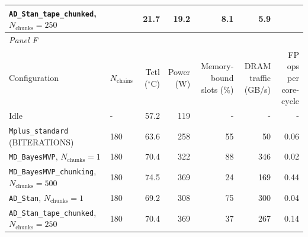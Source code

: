 \begin{table}[H]
{\begin{tabular}{llrrrrr}
\makecell[tl]{\texttt{AD\_Stan\_tape\_chunked}, \\ $N_{\text{chunks}} = 250$} & & 21.7 & 19.2 & 8.1 & 5.9 & \\
\hline
\multicolumn{7}{l}{\textit{Panel F}} \\
Configuration & $N_{\text{chains}}$ & \makecell[r]{Tctl \\ ($^{\circ}$C)} & \makecell[r]{Power \\ (W)} & \makecell[r]{Memory-bound \\ slots (\%)} & \makecell[r]{DRAM traffic \\ (GB/s)} & \makecell[r]{FP ops per \\ core-cycle} \\
\hline
Idle & - & 57.2 & 119 & - & - & - \\
\makecell[tl]{\texttt{Mplus\_standard} \\ (BITERATIONS)} & 180 & 63.6 & 258 & 55 & 50 & 0.06 \\
\texttt{MD\_BayesMVP}, $N_{\text{chunks}} = 1$ & 180 & 70.4 & 322 & 88 & 346 & 0.02 \\
\makecell[tl]{\texttt{MD\_BayesMVP\_chunking}, \\ $N_{\text{chunks}} = 500$} & 180 & 74.5 & 369 & 24 & 169 & 0.44 \\
\texttt{AD\_Stan}, $N_{\text{chunks}} = 1$ & 180 & 69.2 & 308 & 75 & 300 & 0.04 \\
\makecell[tl]{\texttt{AD\_Stan\_tape\_chunked}, \\ $N_{\text{chunks}} = 250$} & 180 & 70.4 & 369 & 37 & 267 & 0.14 \\
\hline
\end{tabular}
}
\end{table}
